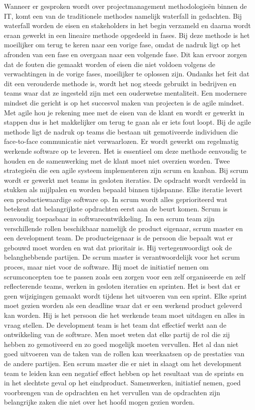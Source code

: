 \documentclass{hogent-article}
\begin{document}
    Wanneer er gesproken wordt over projectmanagement methodologieën binnen de IT, komt een van de traditionele methodes namelijk waterfall in gedachten. Bij waterfall worden de eisen en stakeholders in het begin verzameld en daarna wordt eraan gewerkt in een lineaire methode opgedeeld in fases. Bij deze methode is het moeilijker om terug te keren naar een vorige fase, omdat de nadruk ligt op het afronden van een fase en overgaan naar een volgende fase. Dit kan ervoor zorgen dat de fouten die gemaakt worden of eisen die niet voldoen volgens de verwachtingen in de vorige fases, moeilijker te oplossen zijn. Ondanks het feit dat dit een verouderde methode is, wordt het nog steeds gebruikt in bedrijven en teams waar dat ze ingesteld zijn met een ouderwetse mentaliteit. Een modernere mindset die gericht is op het succesvol maken van projecten is de agile mindset. Met agile hou je rekening mee met de eisen van de klant en wordt er gewerkt in stappen dus is het makkelijker om terug te gaan als er iets fout loopt. Bij de agile methode ligt de nadruk op teams die bestaan uit gemotiveerde individuen die face-to-face communicatie niet verwaarlozen. Er wordt gewerkt om regelmatig werkende software op te leveren. Het is essentieel om deze methode eenvoudig te houden en de samenwerking met de klant moet niet overzien worden. 
    Twee strategieën die een agile systeem implementeren zijn scrum en kanban. Bij scrum wordt er gewerkt met teams in gesloten iteraties. De opdracht wordt verdeeld in stukken als mijlpalen en worden bepaald binnen tijdspanne. Elke iteratie levert een productiewaardige software op. In scrum wordt alles geprioriteerd wat betekent dat belangrijkste opdrachten eerst aan de beurt komen. Scrum is eenvoudig toepasbaar in softwareontwikkeling. In een scrum team zijn verschillende rollen beschikbaar namelijk de product eigenaar, scrum master en een development team. De producteigenaar is de persoon die bepaalt wat er gebouwd moet worden en wat dat prioritair is. Hij vertegenwoordigt ook de belanghebbende partijen. De scrum master is verantwoordelijk voor het scrum proces, maar niet voor de software. Hij moet de initiatief nemen om scrumconcepten toe te passen zoals een zorgen voor een zelf organiseerde en zelf reflecterende teams, werken in gesloten iteraties en sprinten. Het is best dat er geen wijzigingen gemaakt wordt tijdens het uitvoeren van een sprint. Elke sprint moet gezien worden als een deadline waar dat er een werkend product geleverd kan worden. Hij is het persoon die het werkende team moet uitdagen en alles in vraag stellen. De development team is het team dat effectief werkt aan de ontwikkeling van de software. Men moet weten dat elke partij de rol die zij hebben zo gemotiveerd en zo goed mogelijk moeten vervullen. Het al dan niet goed uitvoeren van de taken van de rollen kan weerkaatsen op de prestaties van de andere partijen. Een scrum master die er niet in slaagt om het development team te leiden kan een negatief effect hebben op het resultaat van de sprints en in het slechtste geval op het eindproduct. Samenwerken, initiatief nemen, goed voorbrengen van de opdrachten en het vervullen van de opdrachten zijn belangrijke zaken die niet over het hoofd mogen gezien worden.
    
\end{document}
